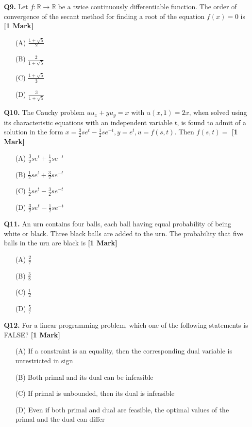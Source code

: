 \documentclass[11pt]{article}
\newcommand{\questiona}[2]{
    \noindent\textbf{Q#2.} #1 \hfill \textbf{[1 Mark]}
}
\begin{document}
\questiona{Let \( f : \mathbb{R} \to \mathbb{R} \) be a twice continuously differentiable function. The order of convergence of the secant method for finding a root of the equation \( f(x) = 0 \) is}{9}
\begin{enumerate}
    \item[(A)] \( \frac{1 + \sqrt{5}}{2} \)
    \item[(B)] \( \frac{2}{1 + \sqrt{5}} \)
    \item[(C)] \( \frac{1 + \sqrt{5}}{3} \)
    \item[(D)] \( \frac{3}{1 + \sqrt{5}} \)
\end{enumerate}
\vspace{0.5cm}

\questiona{The Cauchy problem \( u u_x + y u_y = x \) with \( u(x,1) = 2x \), when solved using its characteristic equations with an independent variable \( t \), is found to admit of a solution in the form \( x = \frac{3}{2} s e^t - \frac{1}{2} s e^{-t}, y = e^t, u = f(s, t) \). Then \( f(s, t) = \)}{10}
\begin{enumerate}
    \item[(A)] \( \frac{3}{2} s e^t + \frac{1}{2} s e^{-t} \)
    \item[(B)] \( \frac{1}{2} s e^t + \frac{3}{2} s e^{-t} \)
    \item[(C)] \( \frac{1}{2} s e^t - \frac{3}{2} s e^{-t} \)
    \item[(D)] \( \frac{3}{2} s e^t - \frac{1}{2} s e^{-t} \)
\end{enumerate}
\vspace{0.5cm}

\questiona{An urn contains four balls, each ball having equal probability of being white or black. Three black balls are added to the urn. The probability that five balls in the urn are black is}{11}
\begin{enumerate}
    \item[(A)] \( \frac{2}{7} \)
    \item[(B)] \( \frac{3}{8} \)
    \item[(C)] \( \frac{1}{2} \)
    \item[(D)] \( \frac{5}{7} \)
\end{enumerate}
\vspace{0.5cm}

\questiona{For a linear programming problem, which one of the following statements is FALSE?}{12}
\begin{enumerate}
    \item[(A)] If a constraint is an equality, then the corresponding dual variable is unrestricted in sign
    \item[(B)] Both primal and its dual can be infeasible
    \item[(C)] If primal is unbounded, then its dual is infeasible
    \item[(D)] Even if both primal and dual are feasible, the optimal values of the primal and the dual can differ
\end{enumerate}
\vspace{0.5cm}
\end{document}

